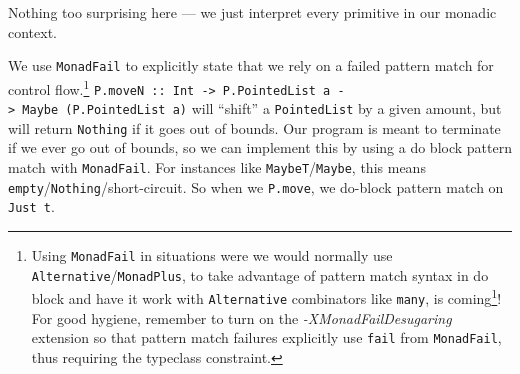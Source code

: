 \documentclass[]{article}
\newenvironment{Shaded}{}{}
\newcommand{\CommentTok}[1]{\textcolor[rgb]{0.38,0.63,0.69}{\textit{#1}}}
\newcommand{\DataTypeTok}[1]{\textcolor[rgb]{0.56,0.13,0.00}{#1}}
\newcommand{\DecValTok}[1]{\textcolor[rgb]{0.25,0.63,0.44}{#1}}
\newcommand{\FunctionTok}[1]{\textcolor[rgb]{0.02,0.16,0.49}{#1}}
\newcommand{\KeywordTok}[1]{\textcolor[rgb]{0.00,0.44,0.13}{\textbf{#1}}}
\newcommand{\NormalTok}[1]{#1}
\newcommand{\OtherTok}[1]{\textcolor[rgb]{0.00,0.44,0.13}{#1}}
\renewcommand{\href}[2]{#2\footnote{\url{#1}}}
\begin{document}
\begin{Shaded}
\end{Shaded}

Nothing too surprising here --- we just interpret every primitive in our monadic
context.

We use \texttt{MonadFail} to explicitly state that we rely on a failed pattern
match for control flow.\footnote{Using \texttt{MonadFail} in situations were we
  would normally use \texttt{Alternative}/\texttt{MonadPlus}, to take advantage
  of pattern match syntax in do block and have it work with \texttt{Alternative}
  combinators like \texttt{many}, is
  \href{https://wiki.haskell.org/MonadFail_Proposal}{coming}! For good hygiene,
  remember to turn on the \emph{-XMonadFailDesugaring} extension so that pattern
  match failures explicitly use \texttt{fail} from \texttt{MonadFail}, thus
  requiring the typeclass constraint.}
\texttt{P.moveN\ ::\ Int\ -\textgreater{}\ P.PointedList\ a\ -\textgreater{}\ Maybe\ (P.PointedList\ a)}
will ``shift'' a \texttt{PointedList} by a given amount, but will return
\texttt{Nothing} if it goes out of bounds. Our program is meant to terminate if
we ever go out of bounds, so we can implement this by using a do block pattern
match with \texttt{MonadFail}. For instances like
\texttt{MaybeT}/\texttt{Maybe}, this means
\texttt{empty}/\texttt{Nothing}/short-circuit. So when we \texttt{P.move}, we
do-block pattern match on \texttt{Just\ t\textquotesingle{}}.
\end{document}
